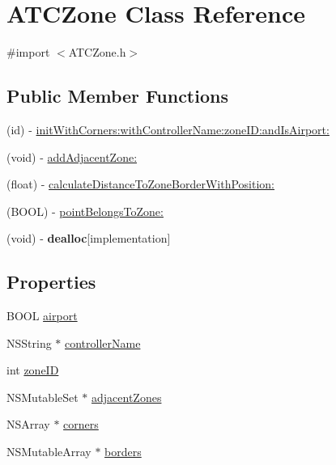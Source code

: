 \hypertarget{interface_a_t_c_zone}{
\section{\-A\-T\-C\-Zone \-Class \-Reference}
\label{interface_a_t_c_zone}
}


{\ttfamily \#import $<$\-A\-T\-C\-Zone.\-h$>$}

\subsection*{\-Public \-Member \-Functions}
\begin{DoxyCompactItemize}
\item 
(id) -\/ \hyperlink{interface_a_t_c_zone_a1d028e1312f3a7a99e513c9d3e0ce4c2}{init\-With\-Corners\-:with\-Controller\-Name\-:zone\-I\-D\-:and\-Is\-Airport\-:}
\item 
(void) -\/ \hyperlink{interface_a_t_c_zone_aa061671cf1d34607f64dcffb1572a1cd}{add\-Adjacent\-Zone\-:}
\item 
(float) -\/ \hyperlink{interface_a_t_c_zone_a3464ed5384a6dfaa3605f5dea3dda105}{calculate\-Distance\-To\-Zone\-Border\-With\-Position\-:}
\item 
(\-B\-O\-O\-L) -\/ \hyperlink{interface_a_t_c_zone_a2520f08b4835b6c189370186bab68dd7}{point\-Belongs\-To\-Zone\-:}
\item 
\hypertarget{interface_a_t_c_zone_a2c593adaba524441e1ba5cfa71993425}{
(void) -\/ {\bfseries dealloc}{\ttfamily  \mbox{[}implementation\mbox{]}}}
\label{interface_a_t_c_zone_a2c593adaba524441e1ba5cfa71993425}

\end{DoxyCompactItemize}
\subsection*{\-Properties}
\begin{DoxyCompactItemize}
\item 
\-B\-O\-O\-L \hyperlink{interface_a_t_c_zone_a05bb671c054d56d893055a229a715d3c}{airport}
\item 
\-N\-S\-String $\ast$ \hyperlink{interface_a_t_c_zone_a3fe3adaf6c79042c465b8be59970316f}{controller\-Name}
\item 
int \hyperlink{interface_a_t_c_zone_a907a2654ed924fd1dc9b7bb2ffa96d9f}{zone\-I\-D}
\item 
\-N\-S\-Mutable\-Set $\ast$ \hyperlink{interface_a_t_c_zone_a983cb960ce7e66488a30c4f680d03992}{adjacent\-Zones}
\item 
\-N\-S\-Array $\ast$ \hyperlink{interface_a_t_c_zone_a2ad0db8ddad83c4c3dfc27b1ec8f6247}{corners}
\item 
\-N\-S\-Mutable\-Array $\ast$ \hyperlink{interface_a_t_c_zone_af14626c068a359ac9e10fd743d92a570}{borders}
\end{DoxyCompactItemize}


